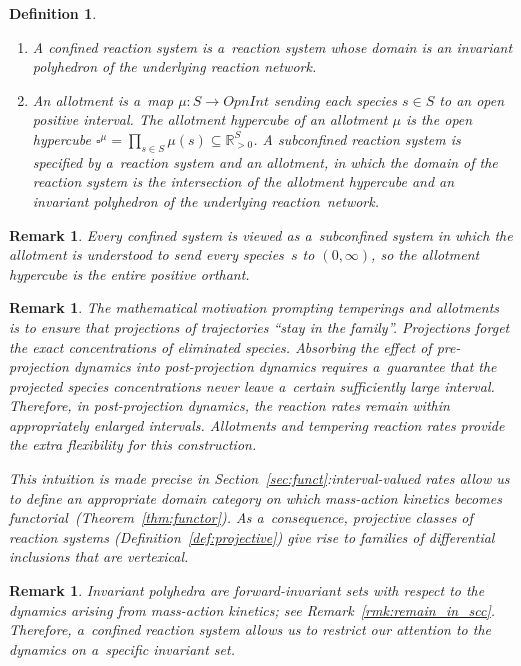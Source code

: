 \documentclass[pdftex]{sigma}
\newtheorem{Definition}[Theorem]{Definition}
\newtheorem{Remark}[Theorem]{Remark}
\begin{document}
\begin{Definition}\qquad
\begin{enumerate}\itemsep=0pt
\item A \emph{confined} reaction system is a~reaction system whose domain is an invariant polyhedron of the
underlying reaction network.
\item An \emph{allotment} is a~map $\mu:S\to\mathit{OpnInt}$ sending each species $s\in S$ to an open positive interval.
The \emph{allotment hypercube} of an allotment $\mu$ is the open hypercube
$\square^\mu=\prod\limits_{s\in S}\mu(s)\subseteq\mathbb{R}_{>0}^S$.
A \emph{subconfined} reaction system is specif\/ied by a~reaction system and an allotment, in which the domain of the
reaction system is the intersection of the allotment hypercube and an invariant polyhedron of the underlying
reaction~network.
\end{enumerate}
\end{Definition}
\begin{Remark}
\label{r:confined_is_subconfined}
Every conf\/ined system is viewed as a~subconf\/ined system in which the allotment is understood to send every
species~$s$ to $(0,\infty)$, so the allotment hypercube is the entire positive orthant.
\end{Remark}
\begin{Remark}
The mathematical motivation prompting temperings and allotments is to ensure that projections of trajectories ``stay in
the family''.
Projections forget the exact concentrations of eliminated species.
Absorbing the ef\/fect of pre-projection dynamics into post-projection dynamics requires a~guarantee that the projected
species concentrations never leave a~certain suf\/f\/iciently large interval.
Therefore, in post-projection dynamics, the reaction rates remain within appropriately enlarged intervals.
Allotments and tempering reaction rates provide the extra f\/lexibility for this construction.

This intuition is made precise in Section~\ref{sec:funct}:\;interval-valued rates allow us to def\/ine an appropriate
domain category on which mass-action kinetics becomes functorial~({Theorem~\ref{thm:functor}}).
As a~consequence, projective classes of reaction systems (Def\/inition~\ref{def:projective}) give rise to families of
dif\/ferential inclusions that are vertexical.
\end{Remark}
\begin{Remark}
\label{r:confined}
Invariant polyhedra are forward-invariant sets with respect to the dynamics arising from mass-action kinetics; see
Remark~\ref{rmk:remain_in_scc}.
Therefore, a~conf\/ined reaction system allows us to restrict our attention to the dynamics on a~specif\/ic invariant
set.
\end{Remark}
\end{document}
